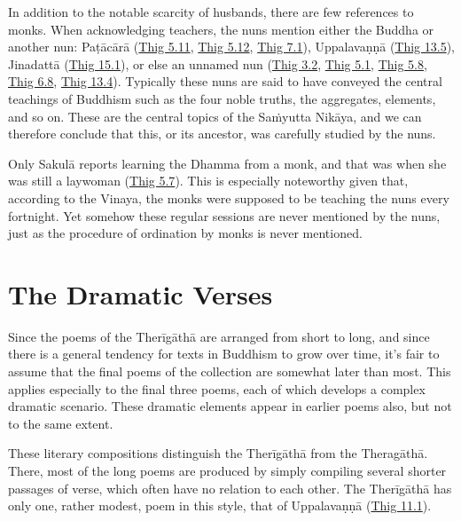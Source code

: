 \documentclass[12pt,openany]{book}%
\begin{document}
In addition to the notable scarcity of husbands, there are few references to monks. When acknowledging teachers, the nuns mention either the Buddha or another nun: \textsanskrit{Paṭācārā} (\href{https://suttacentral.net/thig5.11}{Thig 5.11}, \href{https://suttacentral.net/thig5.12}{Thig 5.12}, \href{https://suttacentral.net/thig7.1}{Thig 7.1}), \textsanskrit{Uppalavaṇṇā} (\href{https://suttacentral.net/thig13.5}{Thig 13.5}), \textsanskrit{Jinadattā} (\href{https://suttacentral.net/thig15.1}{Thig 15.1}), or else an unnamed nun (\href{https://suttacentral.net/thig3.2}{Thig 3.2}, \href{https://suttacentral.net/thig5.1}{Thig 5.1}, \href{https://suttacentral.net/thig5.8}{Thig 5.8}, \href{https://suttacentral.net/thig6.8}{Thig 6.8}, \href{https://suttacentral.net/thig13.4}{Thig 13.4}). Typically these nuns are said to have conveyed the central teachings of Buddhism such as the four noble truths, the aggregates, elements, and so on. These are the central topics of the \textsanskrit{Saṁyutta} \textsanskrit{Nikāya}, and we can therefore conclude that this, or its ancestor, was carefully studied by the nuns.

Only \textsanskrit{Sakulā} reports learning the Dhamma from a monk, and that was when she was still a laywoman (\href{https://suttacentral.net/thig5.7}{Thig 5.7}). This is especially noteworthy given that, according to the Vinaya, the monks were supposed to be teaching the nuns every fortnight. Yet somehow these regular sessions are never mentioned by the nuns, just as the procedure of ordination by monks is never mentioned.

\section*{The Dramatic Verses}

Since the poems of the \textsanskrit{Therīgāthā} are arranged from short to long, and since there is a general tendency for texts in Buddhism to grow over time, it’s fair to assume that the final poems of the collection are somewhat later than most. This applies especially to the final three poems, each of which develops a complex dramatic scenario. These dramatic elements appear in earlier poems also, but not to the same extent.

These literary compositions distinguish the \textsanskrit{Therīgāthā} from the \textsanskrit{Theragāthā}. There, most of the long poems are produced by simply compiling several shorter passages of verse, which often have no relation to each other. The \textsanskrit{Therīgāthā} has only one, rather modest, poem in this style, that of \textsanskrit{Uppalavaṇṇā} (\href{https://suttacentral.net/thig11.1}{Thig 11.1}).
\end{document}
